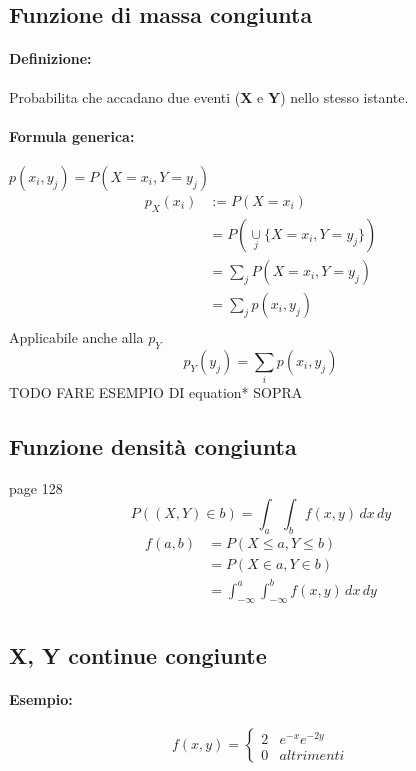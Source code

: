 \documentclass[]{article}
\newcommand{\definizione}{\paragraph{Definizione:}}
\newcommand{\formula}{\paragraph{Formula generica:}}
\begin{document}
    \subsection{Funzione di massa congiunta}
    \definizione Probabilita che accadano due eventi (\textbf{X} e \textbf{Y}) nello stesso istante.
    \formula $ p(x_i, y_j) = P(X=x_i, Y=y_j) $ \\

    \begin{equation*}
        \begin{split}
            p_X(x_i) & := P(X = x_i) \\ 
            & = P(\underset{j}{\cup} \{ X=x_i, Y=y_j \}) \\
            & = \sum_{j}^{} P(X=x_i, Y=y_j) \\ 
            & = \sum_{j}^{} p(x_i, y_j) \\
        \end{split}
    \end{equation*}
    Applicabile anche alla $p_Y$
    \[ p_Y(y_j) = \sum_{i}^{} p(x_i, y_j) \]
    TODO FARE ESEMPIO DI equation* SOPRA


    \subsection{Funzione densità congiunta}
    page 128
    \[ P((X,Y) \in b) = \int_{a}^{} \int_{b}^{} f(x,y) \, dx \, dy \]
    \begin{equation*}
        \begin{split}
            f(a,b) & = P(X \leq a, Y \leq b) \\
            & = P(X \in a, Y \in b) \\
            & = \int_{-\infty}^{a} \int_{-\infty}^{b} f(x,y) \, dx \, dy \\
        \end{split}
    \end{equation*}


    \subsection{X, Y continue congiunte}
    \paragraph{Esempio:}
    \begin{equation*}
        f(x,y) =
        \begin{cases}
            2 & e^{-x} e^{-2y} \\
            0 & altrimenti
        \end{cases}
    \end{equation*}
\end{document}
